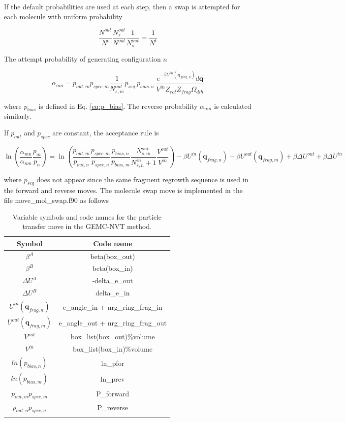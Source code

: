 If the default probabilities are used at each step, then a swap is attempted for each molecule with uniform probability

\begin{equation}
\frac{N^{out}}{N^t} \frac{N^{out}_s}{N^{out}} \frac{1}{N^{out}_s} = \frac{1}{N^t}
\end{equation}

The attempt probability of generating configuration $n$

\begin{equation}
\alpha_{mn} = p_{out,m} p_{spec,m} \frac{1}{N^{out}_{s,m}} p_{seq}\ p_{bias,n}\ \frac{e^{-\beta U^{in}(\mathbf{q}_{frag,n})}d\mathbf{q}}{V^{in}Z_{rot}Z_{frag}\Omega_{dih}}
\label{eq:alpha_mol_swap}
\end{equation}

where $p_{bias}$ is defined in Eq. \ref{eq:p_bias}. The reverse probability $\alpha_{nm}$ is calculated similarly.

If $p_{out}$ and $p_{spec}$ are constant, the acceptance rule is

\begin{equation}
\ln \left( \frac{\alpha_{mn}}{\alpha_{nm}} \frac{p_m}{p_n} \right) = \ln \left( \frac{p_{out,m}}{p_{out,n}} \frac{p_{spec,m}}{p_{spec,n}} \frac{ p_{bias,n}}{p_{bias,m}} \frac{N^{out}_{s,m}}{N^{in}_{s,n}+1} \frac{V^{out}}{V^{in}} \right) - \beta U^{in}(\mathbf{q}_{frag,n})- \beta U^{out}(\mathbf{q}_{frag,m}) + \beta \Delta U^{out} + \beta \Delta U^{in}
\label{eq:pAcc_mol_swap}
\end{equation}

where $p_{seq}$ does not appear since the same fragment regrowth sequence is used in the forward and reverse moves.
The molecule swap move is implemented in the file move\_mol\_swap.f90 as follows

\begin{table}
\caption{Variable symbols and code names for the particle transfer move in the GEMC-NVT method.}
\label{table:gemc_transfer}
\centering
\begin{tabular}{|c|c|} \hline
 {\bf Symbol} & {\bf Code name} \\ \hline
 $\beta^A$ & beta(box\_out) \\
 $\beta^B$ & beta(box\_in) \\
 $\Delta U^A$ & -delta\_e\_out \\
 $\Delta U^B$ & delta\_e\_in \\
 $U^{in}(\mathbf{q}_{frag,n})$ & e\_angle\_in + nrg\_ring\_frag\_in \\
 $U^{out}(\mathbf{q}_{frag,m})$ & e\_angle\_out + nrg\_ring\_frag\_out \\
 $V^{out}$ & box\_list(box\_out)\%volume \\
 $V^{in}$ & box\_list(box\_in)\%volume \\
 $ln(p_{bias,n})$ & ln\_pfor \\
 $ln(p_{bias,m})$ & ln\_prev \\
 $p_{out,m} p_{spec,m}$ & P\_forward \\
 $p_{out,n} p_{spec,n}$ & P\_reverse \\
 \hline
\multicolumn{2}{c}{}
\end{tabular}
\end{table}

